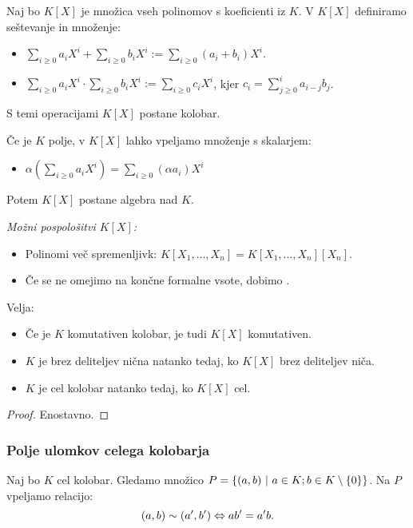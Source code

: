 Naj bo $K[X]$ je množica vseh polinomov s koeficienti iz $K$. V $K[X]$ definiramo seštevanje in množenje:
\begin{itemize}
    \item $\sum_{i \geq 0} a_iX^i + \sum_{i \geq 0} b_iX^i := \sum_{i \geq 0} (a_i + b_i)X^i$.
    \item $\sum_{i \geq 0} a_iX^i \cdot \sum_{i \geq 0} b_iX^i := \sum_{i \geq 0} c_iX^i$, kjer $c_i = \sum_{j \geq 0}^{i} a_{i - j} b_j$.
\end{itemize}
S temi operacijami $K[X]$ postane kolobar.
\begin{opomba}
    Če je $K$ polje, v $K[X]$ lahko vpeljamo množenje s skalarjem:
    \begin{itemize}
        \item $\alpha (\sum_{i \geq 0} a_iX^i) = \sum_{i \geq 0} (\alpha a_i)X^i$
    \end{itemize} 
    Potem $K[X]$ postane algebra nad $K$.
\end{opomba}
\emph{Možni pospološitvi $K[X]$:}
\begin{itemize}
    \item Polinomi več spremenljivk: $K[X_1, \ldots, X_n] = K[X_1, \ldots, X_n][X_n]$.
    \item Če se ne omejimo na končne formalne vsote, dobimo .
\end{itemize}     

\begin{trditev}
    Velja:
    \begin{itemize}
        \item Če je $K$ komutativen kolobar, je tudi $K[X]$ komutativen.
        \item $K$ je brez deliteljev nična natanko tedaj, ko $K[X]$ brez deliteljev niča.
        \item $K$ je cel kolobar natanko tedaj, ko $K[X]$ cel.
    \end{itemize}
\end{trditev}

\begin{proof}
    Enostavno.
\end{proof}

\subsubsection*{Polje ulomkov celega kolobarja}    
Naj bo $K$ cel kolobar. Gledamo množico $P = \left\{(a,b) \ | \ a \in K; b \in K \setminus \left\{0\right\}\right\}$. Na $P$ vpeljamo relacijo:
$$(a, b) \sim (a', b') \Leftrightarrow ab' = a'b.$$

